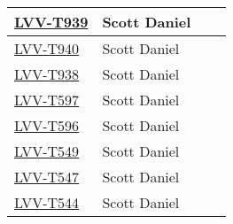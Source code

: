 \documentclass[DM,lsstdraft,STR,toc]{lsstdoc}
\begin{document}
\begin{longtable}{p{3cm}p{3cm}p{3cm}p{6cm}}
\\ \hline
\href{https://jira.lsstcorp.org/secure/Tests.jspa#/testCase/LVV-T939}{LVV-T939}
& {\small Scott Daniel } & {\small  } &
\begin{minipage}[]{6cm}
\smallskip
{\small  }
\medskip
\end{minipage}
\\ \hline
\href{https://jira.lsstcorp.org/secure/Tests.jspa#/testCase/LVV-T940}{LVV-T940}
& {\small Scott Daniel } & {\small  } &
\begin{minipage}[]{6cm}
\smallskip
{\small  }
\medskip
\end{minipage}
\\ \hline
\href{https://jira.lsstcorp.org/secure/Tests.jspa#/testCase/LVV-T938}{LVV-T938}
& {\small Scott Daniel } & {\small  } &
\begin{minipage}[]{6cm}
\smallskip
{\small  }
\medskip
\end{minipage}
\\ \hline
\href{https://jira.lsstcorp.org/secure/Tests.jspa#/testCase/LVV-T597}{LVV-T597}
& {\small Scott Daniel } & {\small  } &
\begin{minipage}[]{6cm}
\smallskip
{\small  }
\medskip
\end{minipage}
\\ \hline
\href{https://jira.lsstcorp.org/secure/Tests.jspa#/testCase/LVV-T596}{LVV-T596}
& {\small Scott Daniel } & {\small  } &
\begin{minipage}[]{6cm}
\smallskip
{\small  }
\medskip
\end{minipage}
\\ \hline
\href{https://jira.lsstcorp.org/secure/Tests.jspa#/testCase/LVV-T549}{LVV-T549}
& {\small Scott Daniel } & {\small  } &
\begin{minipage}[]{6cm}
\smallskip
{\small  }
\medskip
\end{minipage}
\\ \hline
\href{https://jira.lsstcorp.org/secure/Tests.jspa#/testCase/LVV-T547}{LVV-T547}
& {\small Scott Daniel } & {\small  } &
\begin{minipage}[]{6cm}
\smallskip
{\small  }
\medskip
\end{minipage}
\\ \hline
\href{https://jira.lsstcorp.org/secure/Tests.jspa#/testCase/LVV-T544}{LVV-T544}
& {\small Scott Daniel } & {\small  } &
\begin{minipage}[]{6cm}
\smallskip
{\small  }
\medskip
\end{minipage}
\\ \hline

\end{longtable}
\end{document}

